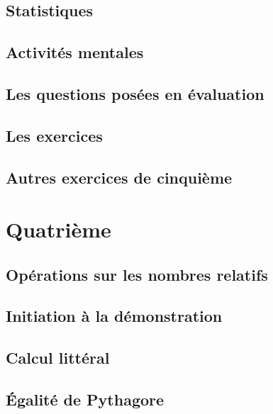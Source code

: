\documentclass[a4paper,10pt]{book}
\begin{document}
\chapter{Statistiques}


\chapter{Activités mentales}


\chapter{Les questions posées en évaluation}


\chapter{Les exercices}


\chapter{Autres exercices de cinquième}


\part{Quatrième}

\chapter{Opérations sur les nombres relatifs}


\chapter{Initiation à la démonstration}


\chapter{Calcul littéral}


\chapter{Égalité de Pythagore}

\end{document}
